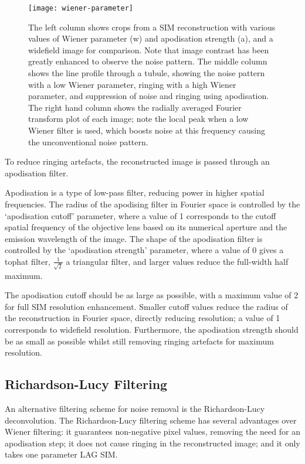 \begin{figure}[p]
\centering
\texttt{[image: wiener-parameter]}
\caption[LAG SIM: The Wiener parameter and apodisation strength must be chosen to minimise artefacts]{The left column shows crops from a SIM reconstruction with various values of Wiener parameter (w) and apodisation strength (a), and a widefield image for comparison. Note that image contrast has been greatly enhanced to observe the noise pattern. The middle column shows the line profile through a tubule, showing the noise pattern with a low Wiener parameter, ringing with a high Wiener parameter, and suppression of noise and ringing using apodisation. The right hand column shows the radially averaged Fourier transform plot of each image; note the local peak when a low Wiener filter is used, which boosts noise at this frequency causing the unconventional noise pattern.}
\label{fig:wiener-parameter}
\end{figure}

To reduce ringing artefacts, the reconstructed image is passed through an apodisation filter. 

Apodisation is a type of low-pass filter, reducing power in higher spatial frequencies. 
The radius of the apodising filter in Fourier space is controlled by the `apodisation cutoff' parameter, where a value of 1 corresponds to the cutoff spatial frequency of the objective lens based on its numerical aperture and the emission wavelength of the image. 
The shape of the apodisation filter is controlled by the `apodisation strength' parameter, where a value of 0 gives a tophat filter, $\frac{1}{\sqrt{2}}$ a triangular filter, and larger values reduce the full-width half maximum. %

The apodisation cutoff should be as large as possible, with a maximum value of 2 for full SIM resolution enhancement. 
Smaller cutoff values reduce the radius of the reconstruction in Fourier space, directly reducing resolution; a value of 1 corresponds to widefield resolution. 
Furthermore, the apodisation strength should be as small as possible whilst still removing ringing artefacts for maximum resolution. 

\subsection{Richardson-Lucy Filtering}
An alternative filtering scheme for noise removal is the Richardson-Lucy deconvolution. 
The Richardson-Lucy filtering scheme has several advantages over Wiener filtering: it guarantees non-negative pixel values, removing the need for an apodisation step; it does not cause ringing in the reconstructed image; and it only takes one parameter LAG SIM.

